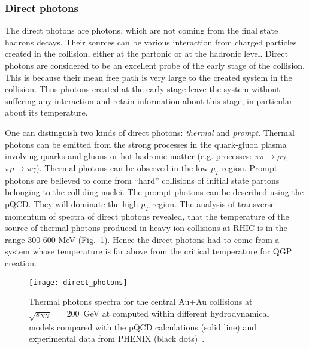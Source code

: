       \subsubsection{Direct photons}
        The direct photons are photons, which are not coming from the final state hadrons decays.
        Their sources can be various interaction from charged particles created in the collision, either at the partonic or at the hadronic level.
        Direct photons are considered to be an excellent probe of the early stage of the collision.
        This is because their mean free path is very large to the created system in the collision.
        Thus photons created at the early stage leave the system without suffering any interaction and retain information about this stage, in particular about its temperature.

        One can distinguish two kinds of direct photons: \textit{thermal} and \textit{prompt}.
        Thermal photons can be emitted from the strong processes in the quark-gluon plasma involving quarks and gluons or hot hadronic matter (e.g. processes: $\pi\pi \to \rho \gamma$, $\pi\rho \to \pi \gamma$).
        Thermal photons can be observed in the low $p_T$ region.
        Prompt photons are believed to come from ``hard'' collisions of initial state partons belonging to the colliding nuclei.
        The prompt photons can be described using the pQCD.
        They will dominate the high $p_T$ region.
        The analysis of transverse momentum of spectra of direct photons revealed, that the temperature of the source of thermal photons produced in heavy ion collisions at RHIC is in the range 300-600 MeV (Fig.~\ref{fig:direct_photons}).
        Hence the direct photons had to come from a system whose temperature is far above from the critical temperature for QGP creation.
        \begin{figure}[h]
          \centering
          \texttt{[image: direct\_photons]}
          \caption{Thermal photons spectra for the central Au+Au collisions at $\sqrt{s_{NN}}=$~200~GeV at computed within different hydrodynamical models compared with the pQCD calculations (solid line) and experimental data from PHENIX (black dots)~\cite{rapp_xu}.}
          \label{fig:direct_photons}
        \end{figure}

